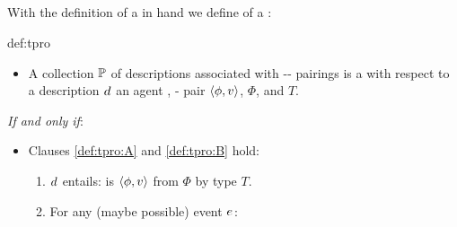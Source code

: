 \subsection{}
\label{sec:tpros}


\begin{note}
  With the definition of a  in hand we define \emph{\tpro{}} of a \torN{}:

  \begin{rdefinition}{def:tpro}{}%
    \vspace{-\baselineskip}
    \begin{itemize}
    \item
      A collection \(\mathbb{P}\) of descriptions associated with -- pairings is a \emph{\tpro{}} with respect to a description \(d\sb{}\) an agent \vAgent{}, - pair \(\langle\phi, v\rangle\), \pool{} \(\Phi\), and \torNa{} \(T\).
    \end{itemize}

    \emph{If and only if}:

    \begin{itemize}
    \item
      Clauses \ref{def:tpro:A} and \ref{def:tpro:B} hold:

      \begin{enumerate}[label=\Alph*., ref=\Alph*]
      \item
        \label{def:tpro:A}
        \(d\sb{}\) entails: \vAgent{} is \tCV{} \(\langle\phi, v\rangle\) from \(\Phi\) by type \(T\).
      \item
        \label{def:tpro:B}
        For any (maybe possible) event \(e\sb{}\):
      \end{enumerate}
    \end{itemize}
    \vspace{-\baselineskip}
  \end{rdefinition}


\end{note}
